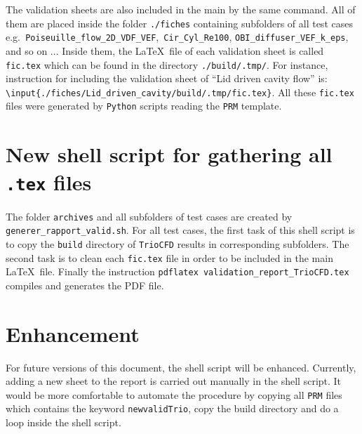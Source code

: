 The validation sheets are also included in the main by the same command.
All of them are placed inside the folder \texttt{./fiches} containing
subfolders of all test cases e.g.\texttt{ Poiseuille\_flow\_2D\_VDF\_VEF},\texttt{
Cir\_Cyl\_Re100}, \texttt{OBI\_diffuser\_VEF\_k\_eps}, and so on ...
Inside them, the \LaTeX~file of each validation sheet is called
\texttt{fic.tex} which can be found in the directory \texttt{./build/.tmp/}.
For instance, instruction for including the validation sheet of ``Lid
driven cavity flow'' is:\newline
\texttt{ \textbackslash{}input\{./fiches/Lid\_driven\_cavity/build/.tmp/fic.tex\}}.
All these \texttt{fic.tex} files were generated by \texttt{Python} scripts reading
the \texttt{PRM} template.
\section{\label{sec:Generating-the-report}New shell script for gathering all \texttt{.tex} files}
The folder \texttt{archives} and all subfolders of test cases are created
by \texttt{generer\_rapport\_valid.sh}. For all test cases, the
first task of this shell script is to copy the \texttt{build} directory
of \texttt{TrioCFD} results in corresponding subfolders. The second
task is to clean each \texttt{fic.tex} file in order to be included
in the main \LaTeX~file.
Finally the instruction \texttt{pdflatex validation\_report\_TrioCFD.tex}
compiles and generates the PDF file.

\section{Enhancement}
For future versions of this document, the shell script will be enhanced.
Currently, adding a new sheet to the report is carried out manually
in the shell script. It would be more comfortable to automate the
procedure by copying all \texttt{PRM} files which contains the keyword
\texttt{newvalidTrio}, copy the build directory and do a loop inside
the shell script.
